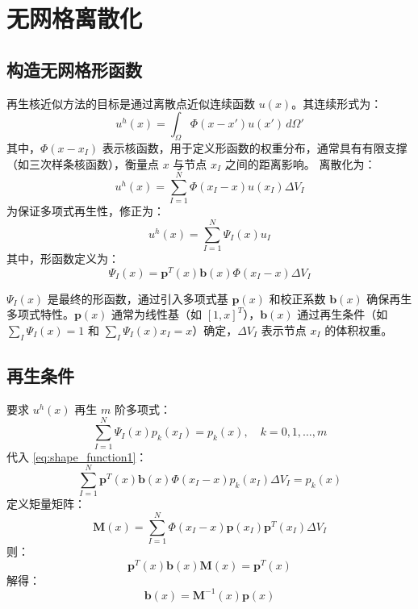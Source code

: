 \documentclass[engineeringmaster]{hquThesis}
\begin{document}
\section{无网格离散化}
\subsection*{构造无网格形函数}
再生核近似方法的目标是通过离散点近似连续函数 \( u(x) \)。其连续形式为：
\begin{equation}
    u^h(x) = \int_{\Omega} \Phi(x - x') u(x') \, d\Omega'
    \label{eq:rka_continuous}
\end{equation}
其中，\(\Phi(x - x_I)\) 表示核函数，用于定义形函数的权重分布，通常具有有限支撑（如三次样条核函数），衡量点 \( x \) 与节点 \( x_I \) 之间的距离影响。
离散化为：
\begin{equation}
    u^h(x) = \sum_{I=1}^{N} \Phi(x_I - x) u(x_I) \Delta V_I
    \label{eq:rka_discrete}
\end{equation}
为保证多项式再生性，修正为：
\begin{equation}
    u^h(x) = \sum_{I=1}^{N} \Psi_I(x) u_I
    \label{eq:rka_corrected}
\end{equation}
其中，形函数定义为：
\begin{equation}
    \Psi_I(x) = \boldsymbol{p}^T(x) \boldsymbol{b}(x) \Phi(x_I - x) \Delta V_I
    \label{eq:shape_function1}
\end{equation}

\(\Psi_I(x)\) 是最终的形函数，通过引入多项式基 \(\boldsymbol{p}(x)\) 和校正系数 \(\boldsymbol{b}(x)\) 确保再生多项式特性。\(\boldsymbol{p}(x)\) 通常为线性基（如 \([1, x]^T\)），\(\boldsymbol{b}(x)\) 通过再生条件（如 \(\sum_I \Psi_I(x) = 1\) 和 \(\sum_I \Psi_I(x) x_I = x\)）确定，\(\Delta V_I\) 表示节点 \( x_I \) 的体积权重。
\subsection*{再生条件}
要求 \( u^h(x) \) 再生 \( m \) 阶多项式：
\begin{equation}
    \sum_{I=1}^{N} \Psi_I(x) p_k(x_I) = p_k(x), \quad k = 0, 1, \dots, m
    \label{eq:reproducing_condition}
\end{equation}
代入 \eqref{eq:shape_function1}：
\begin{equation}
    \sum_{I=1}^{N} \boldsymbol{p}^T(x) \boldsymbol{b}(x) \Phi(x_I - x) p_k(x_I) \Delta V_I = p_k(x)
    \label{eq:reproducing_substituted}
\end{equation}
定义矩量矩阵：
\begin{equation}
    \boldsymbol{M}(x) = \sum_{I=1}^{N} \Phi(x_I - x) \boldsymbol{p}(x_I) \boldsymbol{p}^T(x_I) \Delta V_I
    \label{eq:moment_matrix}
\end{equation}
则：
\begin{equation}
    \boldsymbol{p}^T(x) \boldsymbol{b}(x) \boldsymbol{M}(x) = \boldsymbol{p}^T(x)
    \label{eq:reproducing_matrix}
\end{equation}
解得：
\begin{equation}
    \boldsymbol{b}(x) = \boldsymbol{M}^{-1}(x) \boldsymbol{p}(x)
    \label{eq:correction_coefficient}
\end{equation}
\end{document}
